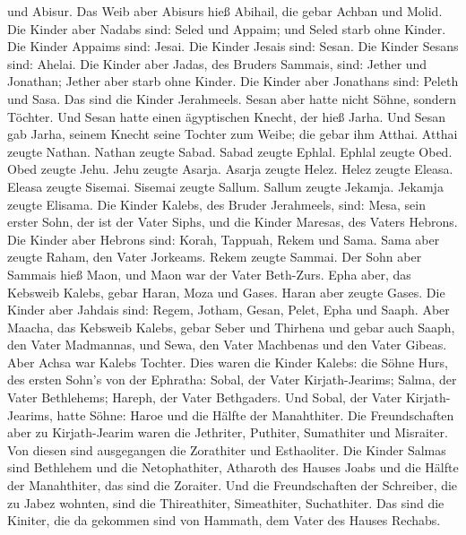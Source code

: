 und Abisur.  Das Weib aber Abisurs hieß Abihail, die gebar
Achban und Molid.  Die Kinder aber Nadabs sind: Seled und
Appaim; und Seled starb ohne Kinder.  Die Kinder Appaims
sind: Jesai. Die Kinder Jesais sind: Sesan. Die Kinder Sesans sind:
Ahelai.  Die Kinder aber Jadas, des Bruders Sammais, sind:
Jether und Jonathan; Jether aber starb ohne Kinder.  Die
Kinder aber Jonathans sind: Peleth und Sasa. Das sind die Kinder
Jerahmeels.  Sesan aber hatte nicht Söhne, sondern Töchter.
Und Sesan hatte einen ägyptischen Knecht, der hieß Jarha. 
Und Sesan gab Jarha, seinem Knecht seine Tochter zum Weibe; die gebar
ihm Atthai.  Atthai zeugte Nathan. Nathan zeugte Sabad.
 Sabad zeugte Ephlal. Ephlal zeugte Obed. 
Obed zeugte Jehu. Jehu zeugte Asarja.  Asarja zeugte Helez.
Helez zeugte Eleasa.  Eleasa zeugte Sisemai. Sisemai zeugte
Sallum.  Sallum zeugte Jekamja. Jekamja zeugte Elisama.
 Die Kinder Kalebs, des Bruder Jerahmeels, sind: Mesa, sein
erster Sohn, der ist der Vater Siphs, und die Kinder Maresas, des Vaters
Hebrons.  Die Kinder aber Hebrons sind: Korah, Tappuah,
Rekem und Sama.  Sama aber zeugte Raham, den Vater
Jorkeams. Rekem zeugte Sammai.  Der Sohn aber Sammais hieß
Maon, und Maon war der Vater Beth-Zurs.  Epha aber, das
Kebsweib Kalebs, gebar Haran, Moza und Gases. Haran aber zeugte Gases.
 Die Kinder aber Jahdais sind: Regem, Jotham, Gesan, Pelet,
Epha und Saaph.  Aber Maacha, das Kebsweib Kalebs, gebar
Seber und Thirhena  und gebar auch Saaph, den Vater
Madmannas, und Sewa, den Vater Machbenas und den Vater Gibeas. Aber
Achsa war Kalebs Tochter.  Dies waren die Kinder Kalebs:
die Söhne Hurs, des ersten Sohn's von der Ephratha: Sobal, der Vater
Kirjath-Jearims;  Salma, der Vater Bethlehems; Hareph, der
Vater Bethgaders.  Und Sobal, der Vater Kirjath-Jearims,
hatte Söhne: Haroe und die Hälfte der Manahthiter.  Die
Freundschaften aber zu Kirjath-Jearim waren die Jethriter, Puthiter,
Sumathiter und Misraiter. Von diesen sind ausgegangen die Zorathiter und
Esthaoliter.  Die Kinder Salmas sind Bethlehem und die
Netophathiter, Atharoth des Hauses Joabs und die Hälfte der Manahthiter,
das sind die Zoraiter.  Und die Freundschaften der
Schreiber, die zu Jabez wohnten, sind die Thireathiter, Simeathiter,
Suchathiter. Das sind die Kiniter, die da gekommen sind von Hammath, dem
Vater des Hauses Rechabs.

